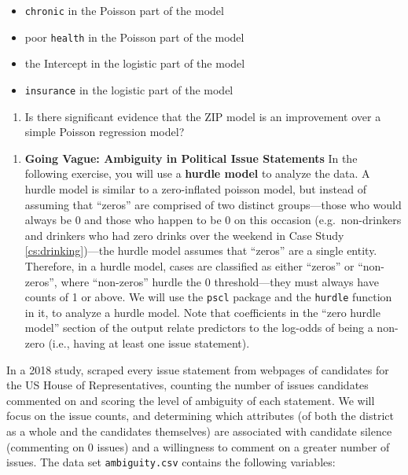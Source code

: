 \documentclass[
]{krantz}
\providecommand{\tightlist}{%
  \setlength{\itemsep}{0pt}\setlength{\parskip}{0pt}}
\begin{document}
\begin{itemize}
\tightlist
\item
  \texttt{chronic} in the Poisson part of the model
\item
  poor \texttt{health} in the Poisson part of the model
\item
  the Intercept in the logistic part of the model
\item
  \texttt{insurance} in the logistic part of the model
\end{itemize}

\begin{enumerate}
\def\labelenumi{\alph{enumi}.}
\setcounter{enumi}{2}
\tightlist
\item
  Is there significant evidence that the ZIP model is an improvement over a simple Poisson regression model?
\end{enumerate}

\begin{enumerate}
\def\labelenumi{\arabic{enumi}.}
\setcounter{enumi}{6}
\tightlist
\item
  \textbf{Going Vague: Ambiguity in Political Issue Statements} In the following exercise, you will use a \textbf{hurdle model} to analyze the data. A hurdle model is similar to a zero-inflated poisson model, but instead of assuming that ``zeros'' are comprised of two distinct groups---those who would always be 0 and those who happen to be 0 on this occasion (e.g.~non-drinkers and drinkers who had zero drinks over the weekend in Case Study \ref{cs:drinking})---the hurdle model assumes that ``zeros'' are a single entity. Therefore, in a hurdle model, cases are classified as either ``zeros'' or ``non-zeros'', where ``non-zeros'' hurdle the 0 threshold---they must always have counts of 1 or above. We will use the \texttt{pscl} package and the \texttt{hurdle} function in it, to analyze a hurdle model. Note that coefficients in the ``zero hurdle model'' section of the output relate predictors to the log-odds of being a non-zero (i.e., having at least one issue statement).
\end{enumerate}

In a 2018 study, \citet{Chapp2018} scraped every issue statement from webpages of candidates for the US House of Representatives, counting the number of issues candidates commented on and scoring the level of ambiguity of each statement. We will focus on the issue counts, and determining which attributes (of both the district as a whole and the candidates themselves) are associated with candidate silence (commenting on 0 issues) and a willingness to comment on a greater number of issues. The data set \texttt{ambiguity.csv} contains the following variables:
\end{document}
